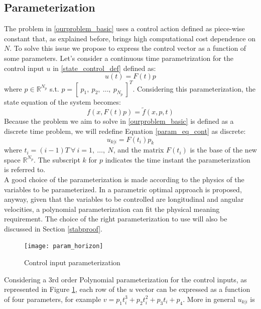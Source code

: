 \subsection{Parameterization}
The problem in \ref{ourproblem_basic} uses a control action defined as piece-wise constant that, as explained before, brings high computational cost dependence on $N$. To solve this issue we propose to express the control vector as a function of some parameters.
Let's consider a continuous time parametrization for the control input $u$ in \ref{state_control_def} defined as:
\begin{equation}
{u}(t)=F(t)p
\label{param_eq_cont}
\end{equation}
where $p \in \mathbb{R}^{N_p}$ s.t. $p=[\ p_1,\ p_2,\ \dots,\ p_{N_p}\ ]^T$. Considering this parameterization, the state equation of the system becomes:
\begin{equation}
	f(x,F(t)p)=\tilde{f}(x,p,t)
	\label{state_eq_par}
\end{equation}
Because the problem we aim to solve in \ref{ourproblem_basic} is defined as a discrete time problem, we will redefine Equation \ref{param_eq_cont} as discrete:
\begin{equation}\label{param_eq}
{u}_{k|i}=F(t_i)p_k
\end{equation}
where $t_i=(i-1)T\ \forall\ i=1,\ \dots,\  N$, and the matrix $F(t_i)$ is the base of the new space $\mathbb{R}^{N_p}$. The subscript $k$ for $p$ indicates the time instant the parameterization is referred to. \\
A good choice of the parameterization is made according to the physics of the variables to be parameterized. In \cite{kelly2013mobile} a parametric optimal approach is proposed, anyway, given that the variables to be controlled are longitudinal and angular velocities, a polynomial parameterization can fit the physical meaning requirement. The choice of the right parameterization to use will also be discussed in Section \ref{stabproof}. \\
\begin{figure}[h!]
	\centering
	\texttt{[image: param\_horizon]}
	\caption{Control input parameterization}
	\label{param_horizon}
\end{figure}
Considering a 3rd order Polynomial parameterization for the control inputs, as represented in Figure \ref{param_horizon}, each row of the ${u}$ vector can be expressed as a function of four parameters, for example $v=p_1t_i^3+p_2t_i^2+p_3t_i+p_4$. More in general ${u}_{k|i}$ is
